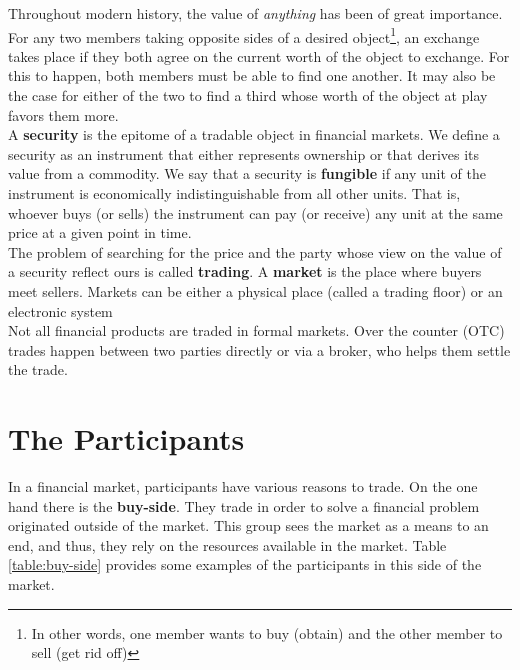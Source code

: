 \documentclass[../TGMAFFIRO]{subfiles}
\begin{document}
Throughout modern history, the value of \textit{anything} has been of great importance. For any two members taking opposite sides of a desired object\footnote{In other words, one member wants to buy (obtain) and the other member to sell (get rid off)}, an exchange takes place if they both agree on the current worth of the object to exchange. For this to happen, both members must be able to find one another. It may also be the case for either of the two to find a third whose worth of the object at play favors them more.\\

A \textbf{security} is the epitome of a tradable object in financial markets. We define a security as an instrument that either represents ownership or that derives its value from a commodity. We say that a security is \textbf{fungible} if any unit of the instrument is economically indistinguishable from all other units. That is, whoever buys (or sells) the instrument can pay (or receive) any unit at the same price at a given point in time.\\

The problem of searching for the price and the party whose view on the value of a security reflect ours is called \textbf{trading}. A \textbf{market} is the place where buyers meet sellers. Markets can be either a physical place (called a trading floor) or an electronic system\\

Not all financial products are traded in formal markets. Over the counter (OTC) trades happen between two parties directly or via a broker, who helps them settle the trade. 

\section{The Participants}
In a financial market, participants have various reasons to trade. On the one hand there is the \textbf{buy-side}. They trade in order to solve a financial problem originated outside of the market. This group sees the market as a means to an end, and thus, they rely on the resources available in the market. Table \ref{table:buy-side} provides some examples of the participants in this side of the market.\\
\end{document}

